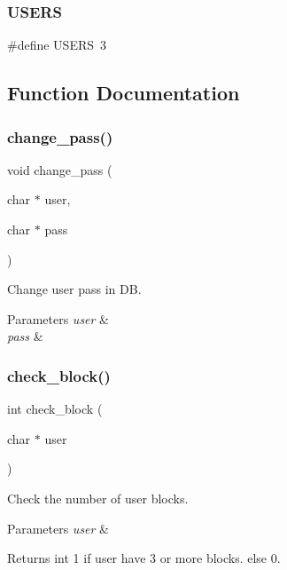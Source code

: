 \subsubsection{U\+S\+E\+RS}
{\footnotesize\ttfamily \#define U\+S\+E\+RS~3}



\subsection{Function Documentation}
\mbox{\label{auth_8h_a97aeb8e1fb29fa958c8ea862bda5ba69}} 
\subsubsection{change\+\_\+pass()}
{\footnotesize\ttfamily void change\+\_\+pass (\begin{DoxyParamCaption}\item[{char $\ast$}]{user,  }\item[{char $\ast$}]{pass }\end{DoxyParamCaption})}



Change user pass in DB. 


\begin{DoxyParams}{Parameters}
{\em user} & \\
\hline
{\em pass} & \\
\hline
\end{DoxyParams}
\mbox{\label{auth_8h_a3bf3271f2878741a36a522714fc1180b}} 
\subsubsection{check\+\_\+block()}
{\footnotesize\ttfamily int check\+\_\+block (\begin{DoxyParamCaption}\item[{char $\ast$}]{user }\end{DoxyParamCaption})}



Check the number of user blocks. 


\begin{DoxyParams}{Parameters}
{\em user} & \\
\hline
\end{DoxyParams}
\begin{DoxyReturn}{Returns}
int 1 if user have 3 or more blocks. else 0. 
\end{DoxyReturn}
\mbox{\label{auth_8h_ad8ec075d0149d64235490cebfdaebfe1}} 
